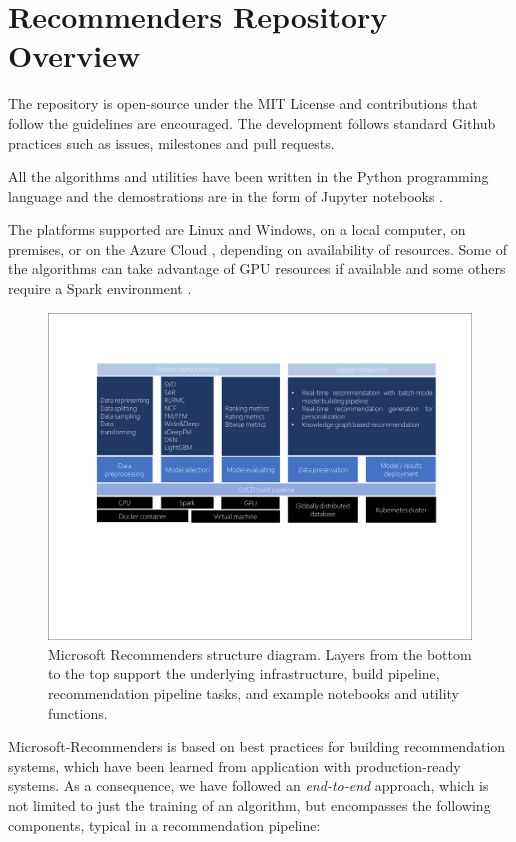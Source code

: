 \section{Recommenders Repository Overview}

The repository is open-source under the MIT License and contributions that follow the guidelines are encouraged.  
The development follows standard Github practices such as issues, milestones and pull requests.

All the algorithms and utilities have been written in the Python programming language and the demostrations are 
in the form of Jupyter notebooks \cite{jupyter}.

The platforms supported are Linux and Windows, on a local computer, on premises, or on the Azure Cloud \cite{azure}, depending on availability of resources.
Some of the algorithms can take advantage of GPU resources if available and some others require a Spark environment \cite{spark}.

\begin{figure}
  \centering
  \includegraphics[width=\textwidth,keepaspectratio]{platform_diagram_crop.pdf}
  \caption{Microsoft Recommenders structure diagram. Layers from the bottom to the top support the underlying infrastructure, build pipeline, recommendation pipeline tasks, and example notebooks and utility functions.}
\end{figure}

Microsoft-Recommenders is based on best practices for building recommendation systems, which have been learned from application with production-ready systems.
As a consequence, we have followed an {\em end-to-end} approach, which is not limited to just the training of an algorithm, but encompasses the following components, typical in a recommendation pipeline:

